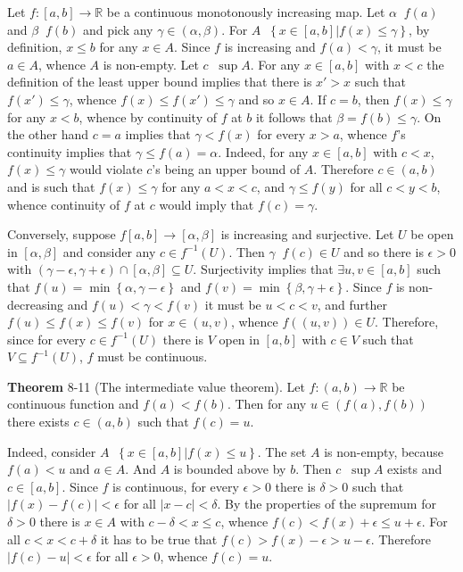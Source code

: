 \documentclass[a4paper]{article}
\newcommand{\obj}[1]{\left\{ #1 \right \}}
\newcommand{\clo}[1]{\left [ #1 \right ]}
\newcommand{\brac}[1]{\left ( #1 \right )}
\newcommand{\induc}[1]{\left . #1 \right \vert}
\newcommand{\abs}[1]{\left | #1 \right |}
\newcommand{\Real}{\mathbb{R}}
\newcommand{\defn}{\mathop{\overset{\Delta}{=}}\nolimits}
\begin{document}
Let $f:\clo{a,b}\to\Real$ be a continuous monotonously increasing map. Let $\alpha\defn f\brac{a}$ and $\beta\defn f\brac{b}$ and pick any $\gamma \in \brac{\alpha, \beta}$. For $A\defn \obj{\induc{ x\in \clo{a,b} } f\brac{x}\leq \gamma }$, by definition, $x\leq b$ for any $x\in A$. Since $f$ is increasing and $f\brac{a}<\gamma$, it must be $a\in A$, whence $A$ is non-empty. Let $c\defn \sup A$. For any $x\in \clo{a,b}$ with $x<c$ the definition of the least upper bound implies that there is $x'> x$ such that $f\brac{x'}\leq \gamma$, whence $f\brac{x}\leq f\brac{x'}\leq \gamma$ and so $x\in A$. If $c=b$, then $f\brac{x}\leq \gamma$ for any $x<b$, whence by continuity of $f$ at $b$ it follows that $\beta = f\brac{b}\leq \gamma$. On the other hand $c=a$ implies that $\gamma<f\brac{x}$ for every $x>a$, whence $f$'s continuity implies that $\gamma\leq f\brac{a}=\alpha$. Indeed, for any $x\in \clo{a,b}$ with $c<x$, $f\brac{x}\leq \gamma$ would violate $c$'s being an upper bound of $A$. Therefore $c\in \brac{a,b}$ and is such that $f\brac{x}\leq \gamma$ for any $a<x<c$, and $\gamma\leq f\brac{y}$ for all $c<y<b$, whence continuity of $f$ at $c$ would imply that $f\brac{c}=\gamma$.

Conversely, suppose $f\clo{a,b}\to\clo{\alpha, \beta}$ is increasing and surjective. Let $U$ be open in $\clo{\alpha, \beta}$ and consider any $c\in f^{-1}\brac{U}$. Then $\gamma \defn f\brac{c}\in U$ and so there is $\epsilon>0$ with $\brac{\gamma-\epsilon, \gamma+\epsilon}\cap \clo{\alpha, \beta} \subseteq U$. Surjectivity implies that $\exists u,v \in \clo{a,b}$ such that $f\brac{u} = \min\obj{\alpha, \gamma-\epsilon}$ and $f\brac{v} = \min\obj{\beta, \gamma+\epsilon}$. Since $f$ is non-decreasing and $f\brac{u}< \gamma < f\brac{v}$ it must be $u<c<v$, and further $f\brac{u}\leq f\brac{x}\leq f\brac{v}$ for $x\in \brac{u,v}$, whence $f\brac{\brac{u,v}}\in U$. Therefore, since for every $c\in f^{-1}\brac{U}$ there is $V$ open in $\clo{a,b}$ with $c\in V$ such that $V\subseteq f^{-1}\brac{U}$, $f$ must be continuous.

\label{thm:cont_ivt2} \noindent \textbf{Theorem} 8-11 (The intermediate value theorem).
Let $f:\brac{a,b}\to \Real$ be continuous function and $f\brac{a}<f\brac{b}$. Then for any $u\in \brac{f\brac{a}, f\brac{b}}$ there exists $c\in \brac{a,b}$ such that $f\brac{c}=u$.

Indeed, consider $A\defn \obj{\induc{x\in \clo{a,b}} f\brac{x}\leq u}$. The set $A$ is non-empty, because $f\brac{a}<u$ and $a\in A$. And $A$ is bounded above by $b$. Then $c\defn \sup A$ exists and $c\in \clo{a,b}$. Since $f$ is continuous, for every $\epsilon>0$ there is $\delta>0$ such that $\abs{f\brac{x}-f\brac{c}}<\epsilon$ for all $\abs{x-c}<\delta$. By the properties of the supremum for $\delta>0$ there is $x\in A$ with $c-\delta<x\leq c$, whence $f\brac{c}<f\brac{x}+\epsilon\leq u+\epsilon$. For all $c<x<c+\delta$ it has to be true that $f\brac{c}>f\brac{x}-\epsilon > u-\epsilon$. Therefore $\abs{f\brac{c}-u}<\epsilon$ for all $\epsilon>0$, whence $f\brac{c}=u$.\\
\end{document}
